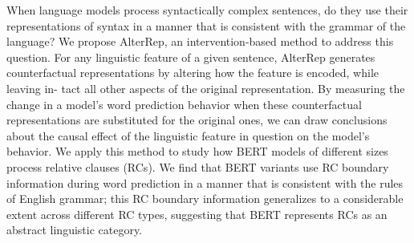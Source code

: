 When language models process syntactically complex sentences, do they use their representations of syntax in a manner that is consistent with the grammar of the language? We propose AlterRep, an intervention-based method to address this question. For any linguistic feature of a given sentence, AlterRep generates counterfactual representations by altering how the feature is encoded, while leaving in- tact all other aspects of the original representation. By measuring the change in a model's word prediction behavior when these counterfactual representations are substituted for the original ones, we can draw conclusions about the causal effect of the linguistic feature in question on the model's behavior. We apply this method to study how BERT models of different sizes process relative clauses (RCs). We find that BERT variants use RC boundary information during word prediction in a manner that is consistent with the rules of English grammar; this RC boundary information generalizes to a considerable extent across different RC types, suggesting that BERT represents RCs as an abstract linguistic category.
